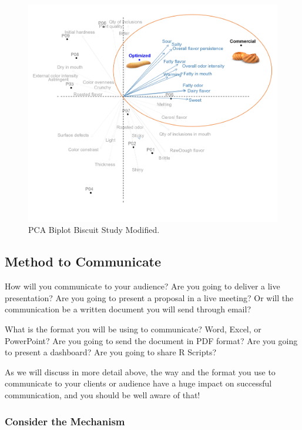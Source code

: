 \documentclass[
]{book}
\begin{document}
\begin{figure}

{\centering \includegraphics[width=0.85\linewidth]{images/PCA_management} 

}

\caption{PCA Biplot Biscuit Study Modified.}\label{fig:pcamanagement}
\end{figure}

\hypertarget{method-to-communicate}{%
\subsection{Method to Communicate}\label{method-to-communicate}}

How will you communicate to your audience? Are you going to deliver a live presentation? Are you going to present a proposal in a live meeting? Or will the communication be a written document you will send through email?

What is the format you will be using to communicate? Word, Excel, or PowerPoint? Are you going to send the document in PDF format? Are you going to present a dashboard? Are you going to share R Scripts?

As we will discuss in more detail above, the way and the format you use to communicate to your clients or audience have a huge impact on successful communication, and you should be well aware of that!

\hypertarget{consider-the-mechanism}{%
\subsubsection{Consider the Mechanism}\label{consider-the-mechanism}}
\end{document}
